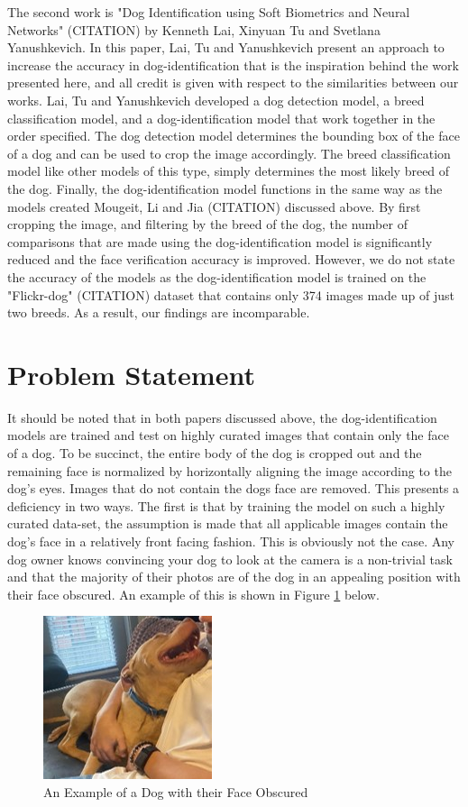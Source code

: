\documentclass{article}
\begin{document}
	The second work is "Dog Identification using Soft Biometrics and Neural Networks" (CITATION) by Kenneth Lai, Xinyuan Tu and Svetlana Yanushkevich.  In this paper, Lai, Tu and Yanushkevich present an approach to increase the accuracy in dog-identification that is the inspiration behind the work presented here, and all credit is given with respect to the similarities between our works.  Lai, Tu and Yanushkevich developed a dog detection model, a breed classification model, and a dog-identification model that work together in the order specified.   The dog detection model determines the bounding box of the face of a dog and can be used to crop the image accordingly.  The breed classification model like other models of this type, simply determines the most likely breed of the dog.  Finally, the dog-identification model functions in the same way as the models created  Mougeit, Li and Jia (CITATION) discussed above.  By first cropping the image, and filtering by the breed of the dog, the number of comparisons that are made using the dog-identification model is significantly reduced and the face verification accuracy is improved.  However, we do not state the accuracy of the models as the dog-identification model is trained on the "Flickr-dog" (CITATION) dataset that contains only 374 images made up of just two breeds.  As a result, our findings are incomparable.

\section{Problem Statement}
	It should be noted that in both papers discussed above, the dog-identification models are trained and test on highly curated images that contain only the face of a dog.  To be succinct, the entire body of the dog is cropped out and the remaining face is normalized by horizontally aligning the image according to the dog's eyes.  Images that do not contain the dogs face are removed.  This presents a deficiency in two ways.  The first is that by training the model on such a highly curated data-set, the assumption is made that all applicable images contain the dog's face in a relatively front facing fashion.  This is obviously not the case.  Any dog owner knows convincing your dog to look at the camera is a non-trivial task and that the majority of their photos are of the dog in an appealing position with their face obscured.  An example of this is shown in Figure \ref{fig:x dog no face} below.  


\begin{figure}[h]
\centering
	\includegraphics{final-report-images/nofacedog.jpg}
\caption{An Example of a Dog with their Face Obscured}
\label{fig:x dog no face}
\end{figure}
\newpage
\end{document}
